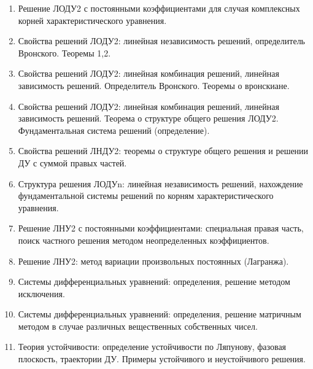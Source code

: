 \documentclass[12pt]{article}
\begin{document}
\begin{enumerate}
        \item Решение ЛОДУ2 с постоянными коэффициентами для случая комплексных корней характеристического уравнения.


        \item Свойства решений ЛОДУ2: линейная независимость решений, определитель Вронского. Теоремы 1,2.


        \item Свойства решений ЛОДУ2: линейная комбинация решений, линейная зависимость решений. Определитель Вронского. Теоремы о вронскиане.


        \item Свойства решений ЛОДУ2: линейная комбинация решений, линейная зависимость решений. Теорема о структуре общего решения ЛОДУ2. Фундаментальная система решений (определение).


        \item Свойства решений ЛНДУ2: теоремы о структуре общего решения и решении ДУ с суммой правых частей.


        \item Структура решения ЛОДУn: линейная независимость решений, нахождение фундаментальной системы решений по корням характеристического уравнения.


        \item Решение ЛНУ2 с постоянными коэффициентами: специальная правая часть, поиск частного решения методом неопределенных коэффициентов.


        \item Решение ЛНУ2: метод вариации произвольных постоянных (Лагранжа).


        \item Системы дифференциальных уравнений: определения, решение методом исключения.


        \item Системы дифференциальных уравнений: определения, решение матричным методом в случае различных вещественных собственных чисел.


        \item Теория устойчивости: определение устойчивости по Ляпунову, фазовая плоскость, траектории ДУ. Примеры устойчивого и неустойчивого решения.


    \end{enumerate}
\end{document}
